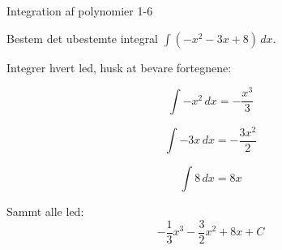 \documentclass{article}
\begin{document}
\newpage

\begin{exercise}{Integration af polynomier 1-6}

Bestem det ubestemte integral $\int (-x^2 - 3x + 8) \, dx$.


\hint

Integrer hvert led, husk at bevare fortegnene:

\hint
\[
\int -x^2 \, dx = -\frac{x^3}{3}
\]

\hint
\[
\int -3x \, dx = -\frac{3x^2}{2}
\]

\hint
\[
\int 8 \, dx = 8x
\]

\hint

Sammt alle led:
\[
-\frac{1}{3}x^3 - \frac{3}{2}x^2 + 8x + C
\]

\end{exercise}
\end{document}
